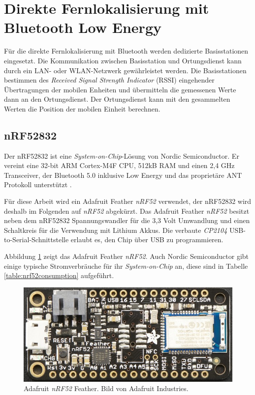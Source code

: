 \section{Direkte Fernlokalisierung mit Bluetooth Low Energy}
\label{ch:phase3}
Für die direkte Fernlokalisierung mit Bluetooth werden dedizierte Basisstationen eingesetzt.
Die Kommunikation zwischen Basisstation und Ortungsdienst kann durch ein LAN- oder WLAN-Netzwerk gewährleistet werden.
Die Basisstationen bestimmen des \emph{Received Signal Strength Indicator} (RSSI) eingehender Übertragungen der mobilen Enheiten und übermitteln die gemessenen Werte dann an den Ortungsdienst.
Der Ortungsdienst kann mit den gesammelten Werten die Position der mobilen Einheit berechnen.

\subsection{nRF52832}
Der nRF52832 ist eine \emph{System-on-Chip}-Lösung von Nordic Semiconductor.
Er vereint eine 32-bit ARM Cortex-M4F CPU, 512kB RAM und einen 2,4 GHz Transceiver, der Bluetooth 5.0 inklusive Low Energy und das proprietäre ANT Protokoll unterstützt \cite{nordic2017nrf}.

Für diese Arbeit wird ein Adafruit Feather \emph{nRF52} verwendet, der nRF52832 wird deshalb im Folgenden auf \emph{nRF52} abgekürzt.
Das Adafruit Feather \emph{nRF52} besitzt neben dem nRF52832 Spannungswandler für die 3,3 Volt Umwandlung und einen Schaltkreis für die Verwendung mit Lithium Akkus.
Die verbaute \emph{CP2104} USB-to-Serial-Schnittstelle erlaubt es, den Chip über USB zu programmieren.

Abbildung \ref{fig:nrf52layout} zeigt das Adafruit Feather \emph{nRF52}.
Auch Nordic Semiconductor gibt einige typische Stromverbräuche für ihr \emph{System-on-Chip} an, diese sind in Tabelle \ref{table:nrf52consumption} aufgeführt.

\begin{figure}[h]
  \centering
	\includegraphics[width=\textwidth]{images/nrf52ada.png}
  \caption{Adafruit \emph{nRF52} Feather. Bild von Adafruit Industries\protect \footnotemark.}
  \label{fig:nrf52layout}
\end{figure}

